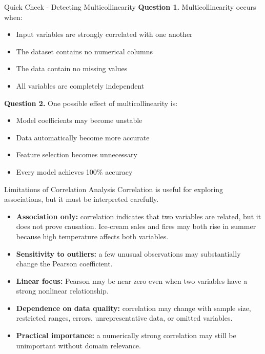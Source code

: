 \documentclass[aspectratio=169,11pt]{beamer}
\begin{document}
\begin{frame}[allowframebreaks]{Quick Check - Detecting Multicollinearity}
\footnotesize
\textbf{Question 1.} Multicollinearity occurs when:\par\medskip
\begin{itemize}
\item[\textbf{A.}] Input variables are strongly correlated with one another
\item[\textbf{B.}] The dataset contains no numerical columns
\item[\textbf{C.}] The data contain no missing values
\item[\textbf{D.}] All variables are completely independent
\end{itemize}
\textbf{Question 2.} One possible effect of multicollinearity is:\par\medskip
\begin{itemize}
\item[\textbf{A.}] Model coefficients may become unstable
\item[\textbf{B.}] Data automatically become more accurate
\item[\textbf{C.}] Feature selection becomes unnecessary
\item[\textbf{D.}] Every model achieves 100\% accuracy
\end{itemize}
\end{frame}

\begin{frame}[allowframebreaks]{Limitations of Correlation Analysis}
\small
Correlation is useful for exploring associations, but it must be interpreted carefully.\par\medskip
\begin{itemize}
\item \textbf{Association only:} correlation indicates that two variables are related, but it does not prove causation. Ice-cream sales and fires may both rise in summer because high temperature affects both variables.
\item \textbf{Sensitivity to outliers:} a few unusual observations may substantially change the Pearson coefficient.
\item \textbf{Linear focus:} Pearson may be near zero even when two variables have a strong nonlinear relationship.
\item \textbf{Dependence on data quality:} correlation may change with sample size, restricted ranges, errors, unrepresentative data, or omitted variables.
\item \textbf{Practical importance:} a numerically strong correlation may still be unimportant without domain relevance.
\end{itemize}
\end{frame}
\end{document}
